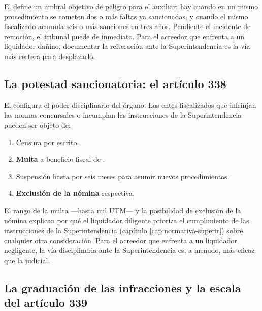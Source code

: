 \begin{practica}
El   define un umbral objetivo de peligro para el auxiliar: hay
 cuando en un mismo procedimiento se cometen dos o más faltas ya
sancionadas, y  cuando el mismo fiscalizado acumula seis o más sanciones
en tres años. Pendiente el incidente de remoción, el tribunal puede  de
inmediato. Para el acreedor que enfrenta a un liquidador dañino, documentar la reiteración ante la
Superintendencia es la vía más certera para desplazarlo.
\end{practica}

\subsection{La potestad sancionatoria: el artículo 338}

El  configura el poder disciplinario del órgano. Los entes fiscalizados que
infrinjan las normas concursales o incumplan las instrucciones de la Superintendencia pueden
ser objeto de:

\begin{enumerate}
  \item Censura por escrito.
  \item \textbf{Multa} a beneficio fiscal de .
  \item Suspensión hasta por seis meses para asumir nuevos procedimientos.
  \item \textbf{Exclusión de la nómina} respectiva.
\end{enumerate}

\begin{foco}
El rango de la multa ---hasta mil UTM--- y la posibilidad de exclusión de la nómina explican
por qué el liquidador diligente prioriza el cumplimiento de las instrucciones de la
Superintendencia (capítulo \ref{cap:normativa-superir}) sobre cualquier otra consideración.
Para el acreedor que enfrenta a un liquidador negligente, la vía disciplinaria ante la
Superintendencia es, a menudo, más eficaz que la judicial.
\end{foco}

\subsection{La graduación de las infracciones y la escala del artículo 339}

